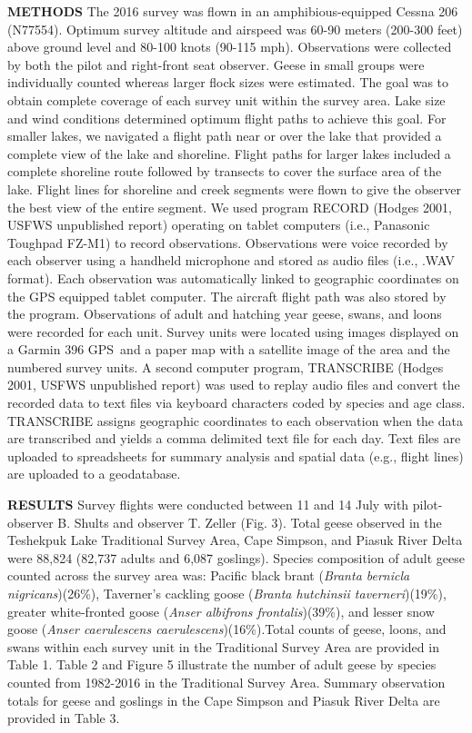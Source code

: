 \documentclass[]{article}
\begin{document}
\textbf{METHODS}\break
The 2016 survey was flown in an amphibious-equipped Cessna 206 (N77554).
Optimum survey altitude and airspeed was 60-90 meters (200-300 feet)
above ground level and 80-100 knots (90-115 mph). Observations were
collected by both the pilot and right-front seat observer. Geese in
small groups were individually counted whereas larger flock sizes were
estimated. The goal was to obtain complete coverage of each survey unit
within the survey area. Lake size and wind conditions determined optimum
flight paths to achieve this goal. For smaller lakes, we navigated a
flight path near or over the lake that provided a complete view of the
lake and shoreline. Flight paths for larger lakes included a complete
shoreline route followed by transects to cover the surface area of the
lake. Flight lines for shoreline and creek segments were flown to give
the observer the best view of the entire segment. We used program RECORD
(Hodges 2001, USFWS unpublished report) operating on tablet computers
(i.e., Panasonic Toughpad FZ-M1\texttrademark) to record observations.
Observations were voice recorded by each observer using a handheld
microphone and stored as audio files (i.e., .WAV format). Each
observation was automatically linked to geographic coordinates on the
GPS equipped tablet computer. The aircraft flight path was also stored
by the program. Observations of adult and hatching year geese, swans,
and loons were recorded for each unit. Survey units were located using
images displayed on a Garmin 396 GPS\texttrademark~and a paper map with
a satellite image of the area and the numbered survey units. A second
computer program, TRANSCRIBE (Hodges 2001, USFWS unpublished report) was
used to replay audio files and convert the recorded data to text files
via keyboard characters coded by species and age class. TRANSCRIBE
assigns geographic coordinates to each observation when the data are
transcribed and yields a comma delimited text file for each day. Text
files are uploaded to spreadsheets for summary analysis and spatial data
(e.g., flight lines) are uploaded to a geodatabase.

\setlength{\parskip}{4ex} \textbf{RESULTS}\newline
Survey flights were conducted between 11 and 14 July with pilot-observer
B. Shults and observer T. Zeller (Fig. 3). Total geese observed in the
Teshekpuk Lake Traditional Survey Area, Cape Simpson, and Piasuk River
Delta were 88,824 (82,737 adults and 6,087 goslings). Species
composition of adult geese counted across the survey area was: Pacific
black brant (\textit{Branta bernicla nigricans})(26\%), Taverner's
cackling goose (\textit{Branta hutchinsii taverneri})(19\%), greater
white-fronted goose (\textit{Anser albifrons frontalis})(39\%), and
lesser snow goose (\textit{Anser caerulescens caerulescens})(16\%).Total
counts of geese, loons, and swans within each survey unit in the
Traditional Survey Area are provided in Table 1. Table 2 and Figure 5
illustrate the number of adult geese by species counted from 1982-2016
in the Traditional Survey Area. Summary observation totals for geese and
goslings in the Cape Simpson and Piasuk River Delta are provided in
Table 3.
\end{document}
